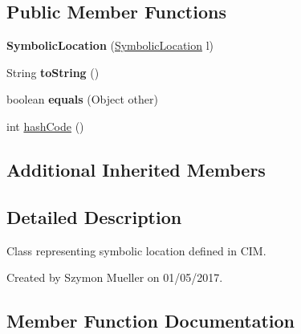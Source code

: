 \subsection*{Public Member Functions}
\begin{DoxyCompactItemize}
\item 
\mbox{\label{classeu_1_1h2020_1_1symbiote_1_1model_1_1cim_1_1SymbolicLocation_a94532dfa8e3da51593d38a9995f1228f}} 
{\bfseries Symbolic\+Location} (\hyperlink{classeu_1_1h2020_1_1symbiote_1_1model_1_1cim_1_1SymbolicLocation}{Symbolic\+Location} l)
\item 
\mbox{\label{classeu_1_1h2020_1_1symbiote_1_1model_1_1cim_1_1SymbolicLocation_afce23add4c7e633f0135d1245548df70}} 
String {\bfseries to\+String} ()
\item 
\mbox{\label{classeu_1_1h2020_1_1symbiote_1_1model_1_1cim_1_1SymbolicLocation_aa9e9aae6f08673062cb166d8447401fa}} 
boolean {\bfseries equals} (Object other)
\item 
int \hyperlink{classeu_1_1h2020_1_1symbiote_1_1model_1_1cim_1_1SymbolicLocation_a72012309c5160c9acb1fe9ca04135b08}{hash\+Code} ()
\end{DoxyCompactItemize}
\subsection*{Additional Inherited Members}


\subsection{Detailed Description}
Class representing symbolic location defined in C\+IM.

Created by Szymon Mueller on 01/05/2017. 

\subsection{Member Function Documentation}
\mbox{\label{classeu_1_1h2020_1_1symbiote_1_1model_1_1cim_1_1SymbolicLocation_a72012309c5160c9acb1fe9ca04135b08}} 
